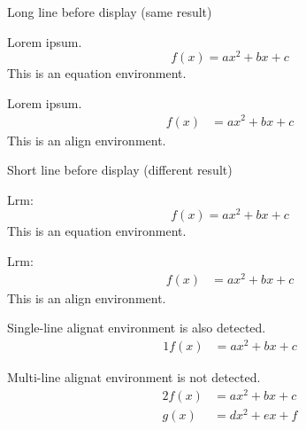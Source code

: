 \documentclass[a4paper]{article}
\newcommand{\tA}[1]{\textcolor{cA}{#1}}
\newcommand{\tD}[1]{\textcolor{cD}{#1}}
\begin{document}
\begin{itembox}{\large Long line before display (same result)}
	\begin{minipage}[t]{.5\columnwidth}
		Lorem ipsum.
		\begin{equation*}
			f(x) = ax^2 + bx + c
		\end{equation*}
		This is an \tA{equation} environment.
	\end{minipage}%
	\begin{minipage}[t]{.5\columnwidth}
		Lorem ipsum.
		\begin{align*}
			f(x) & = ax^2 + bx + c
		\end{align*}
		This is an \tD{align} environment.
	\end{minipage}
\end{itembox}

\vspace{\baselineskip}

\begin{itembox}{\large Short line before display (different result)}
	\begin{minipage}[t]{.5\columnwidth}
		Lrm:
		\begin{equation*}
			f(x) = ax^2 + bx + c
		\end{equation*}
		This is an \tA{equation} environment.
	\end{minipage}%
	\begin{minipage}[t]{.5\columnwidth}
		Lrm:
		\begin{align*}
			f(x) & = ax^2 + bx + c
		\end{align*}
		This is an \tD{align} environment.
	\end{minipage}
\end{itembox}

\vspace{\baselineskip}

Single-line alignat environment is also detected.
\begin{alignat*}{1}
	f(x) & = ax^2 + bx + c
\end{alignat*}

Multi-line alignat environment is not detected.
\begin{alignat*}{2}
	f(x) & = ax^2 + bx + c \\
	g(x) & = dx^2 + ex + f
\end{alignat*}

\end{document}
